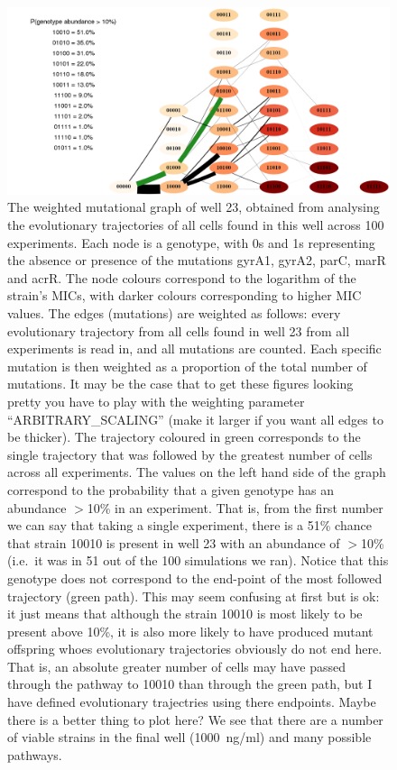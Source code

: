 \documentclass[a4paper,10pt]{article}
\begin{document}
 
\begin{figure}
  \centering
  \includegraphics[width=0.95\linewidth]{MutGraph_23}
\caption{The weighted mutational graph of well 23, obtained from analysing the evolutionary trajectories of all cells found in this well
across 100 experiments. Each node is a genotype, with 0s and 1s representing the absence or presence of the mutations gyrA1, gyrA2, parC, marR and acrR.
The node colours correspond to the logarithm of the strain's MICs, with darker colours corresponding to higher MIC values. The edges (mutations) are weighted
as follows: every evolutionary trajectory from all cells found in well 23 from all experiments is read in, and all mutations are counted. Each specific mutation is then
weighted as a proportion of the total number of mutations. It may be the case that to get these figures looking pretty you have to play with the weighting
parameter ``ARBITRARY\_SCALING'' (make it larger if you want all edges to be thicker). The trajectory coloured in green corresponds to the single trajectory
that was followed by the greatest number of cells across all experiments. The values on the left hand side of the graph correspond to the probability that a given
genotype has an abundance $>$10\% in an experiment. That is, from the first number we can say that taking a single experiment, there is a 51\% chance that strain
10010 is present in well 23 with an abundance of $>$10\% (i.e.~it was in 51 out of the 100 simulations we ran). Notice that this genotype does not correspond
to the end-point of the most followed trajectory (green path). This may seem confusing at first but is ok: it just means that although the strain 10010 is most likely to
be present above 10\%, it is also more likely to have produced mutant offspring whoes evolutionary trajectories obviously do not end here. That is, an absolute greater number 
of cells may have passed through the pathway to 10010 than through the green path, but I have defined evolutionary trajectries using there endpoints. 
Maybe there is a better thing to plot here? We see that there are a number of viable strains in the final well (1000~ng/ml) and many possible pathways.}
\label{fig:mutGraph}
\end{figure}
\end{document}
